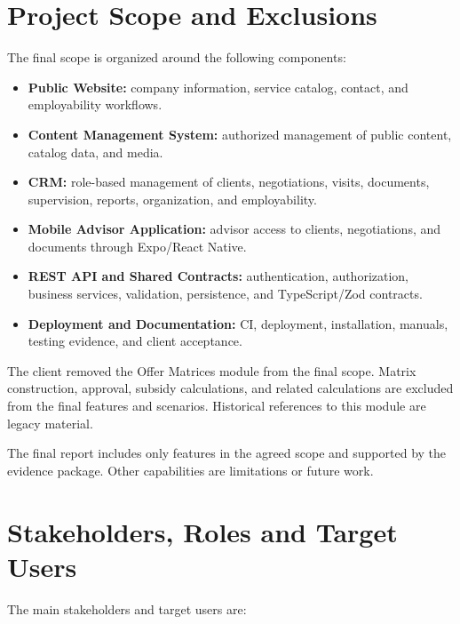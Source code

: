 \documentclass[letterpaper%
, oneside%
, 12pt%
, memoireprojet%
, english%
,creativecommons,hyperref, withAlgo2e %
]{thETS}
\begin{document}
\section{Project Scope and Exclusions}
The final scope is organized around the following components:

\begin{itemize}
    \item \textbf{Public Website:} company information, service catalog, contact, and employability workflows.
    \item \textbf{Content Management System:} authorized management of public content, catalog data, and media.
    \item \textbf{CRM:} role-based management of clients, negotiations, visits, documents, supervision, reports, organization, and employability.
    \item \textbf{Mobile Advisor Application:} advisor access to clients, negotiations, and documents through Expo/React Native.
    \item \textbf{REST API and Shared Contracts:} authentication, authorization, business services, validation, persistence, and TypeScript/Zod contracts.
    \item \textbf{Deployment and Documentation:} CI, deployment, installation, manuals, testing evidence, and client acceptance.
\end{itemize}

The client removed the Offer Matrices module from the final scope. Matrix construction, approval, subsidy calculations, and related calculations are excluded from the final features and scenarios. Historical references to this module are legacy material.

The final report includes only features in the agreed scope and supported by the evidence package. Other capabilities are limitations or future work.

\section{Stakeholders, Roles and Target Users}
The main stakeholders and target users are:
\end{document}
